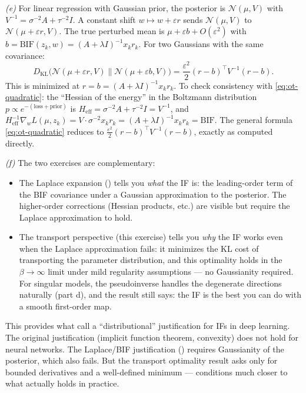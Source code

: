 \documentclass[11pt]{article}
\begin{document}
\begin{solution}[ex:bif-ot]
\textit{(e)} For linear regression with Gaussian prior, the posterior is $\mathcal{N}(\mu,V)$ with $V^{-1} = \sigma^{-2}A + \tau^{-2}I$. A constant shift $w\mapsto w+\varepsilon r$ sends $\mathcal{N}(\mu,V)$ to $\mathcal{N}(\mu+\varepsilon r,V)$. The true perturbed mean is $\mu + \varepsilon b + O(\varepsilon^2)$ with $b = \mathrm{BIF}(z_k,w) = (A+\lambda I)^{-1}x_k r_k$. For two Gaussians with the same covariance:
\[
  D_{\mathrm{KL}}\bigl(\mathcal{N}(\mu+\varepsilon r,V)\|\mathcal{N}(\mu+\varepsilon b,V)\bigr) = \frac{\varepsilon^2}{2}(r-b)^\top V^{-1}(r-b).
\]
This is minimized at $r = b = (A+\lambda I)^{-1}x_k r_k$. To check consistency with \eqref{eq:ot-quadratic}: the ``Hessian of the energy'' in the Boltzmann distribution $p \propto e^{-(\text{loss}+\text{prior})}$ is $H_{\mathrm{eff}} = \sigma^{-2}A + \tau^{-2}I = V^{-1}$, and $H_{\mathrm{eff}}^{-1}\nabla_w L(\mu,z_k) = V\cdot\sigma^{-2}x_k r_k = (A+\lambda I)^{-1}x_k r_k = \mathrm{BIF}$. The general formula \eqref{eq:ot-quadratic} reduces to $\frac{\varepsilon^2}{2}(r-b)^\top V^{-1}(r-b)$, exactly as computed directly.

\textit{(f)} The two exercises are complementary:
\begin{itemize}
  \item The Laplace expansion () tells you \emph{what} the IF is: the leading-order term of the BIF covariance under a Gaussian approximation to the posterior. The higher-order corrections (Hessian products, etc.) are visible but require the Laplace approximation to hold.
  \item The transport perspective (this exercise) tells you \emph{why} the IF works even when the Laplace approximation fails: it minimizes the KL cost of transporting the parameter distribution, and this optimality holds in the $\beta\to\infty$ limit under mild regularity assumptions --- no Gaussianity required. For singular models, the pseudoinverse handles the degenerate directions naturally (part d), and the result still says: the IF is the best you can do with a smooth first-order map.
\end{itemize}
This provides what \citet{mlodozeniec2025distributional} call a ``distributional'' justification for IFs in deep learning. The original justification (implicit function theorem, convexity) does not hold for neural networks. The Laplace/BIF justification () requires Gaussianity of the posterior, which also fails. But the transport optimality result asks only for bounded derivatives and a well-defined minimum --- conditions much closer to what actually holds in practice.

\end{solution}
\end{document}
